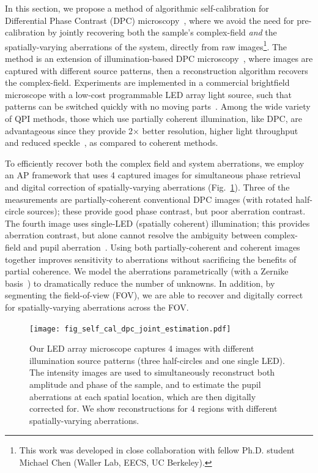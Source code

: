 In this section, we propose a method of algorithmic self-calibration for Differential Phase Contrast (DPC) microscopy~\cite{kachar1985asymmetric,mehta2009quantitative,tian2015quantitative,Claus2015,chen20163d,PhillipsChen17cDPC}, where we avoid the need for pre-calibration by jointly recovering both the sample's complex-field \textit{and} the spatially-varying aberrations of the system, directly from raw images\footnote{This work was developed in close collaboration with fellow Ph.D. student Michael Chen (Waller Lab, EECS, UC Berkeley).}. The method is an extension of illumination-based DPC microscopy~\cite{mehta2009quantitative,tian2015quantitative}, where images are captured with different source patterns, then a reconstruction algorithm recovers the complex-field. Experiments are implemented in a commercial brightfield microscope with a low-cost programmable LED array light source, such that patterns can be switched quickly with no moving parts~\cite{Zheng2013,Liu2014,tian2015quantitative,tian2015computational}. Among the wide variety of QPI methods, those which use partially coherent illumination, like DPC, are advantageous since they provide 2$\times$ better resolution, higher light throughput and reduced speckle~\cite{Wang2011,rodrigo2014rapid,jingshan2015partially,tian2015quantitative}, as compared to coherent methods.


To efficiently recover both the complex field and system aberrations, we employ an AP framework that uses 4 captured images for simultaneous phase retrieval and digital correction of spatially-varying aberrations (Fig.~\ref{fig:self_cal_dpc_joint_estimation}). Three of the measurements are partially-coherent conventional DPC images (with rotated half-circle sources); these provide good phase contrast, but poor aberration contrast. The fourth image uses single-LED (spatially coherent) illumination; this provides aberration contrast, but alone cannot resolve the ambiguity between complex-field and pupil aberration~\cite{lu2016quantitative}. Using both partially-coherent and coherent images together improves sensitivity to aberrations without sacrificing the benefits of partial coherence. We model the aberrations parametrically (with a Zernike basis~\cite{ZERNIKE1934689, zheng2013characterization}) to dramatically reduce the number of unknowns. In addition, by segmenting the field-of-view (FOV), we are able to recover and digitally correct for spatially-varying aberrations across the FOV.

\begin{figure}[ht!]
\centering\texttt{[image: fig\_self\_cal\_dpc\_joint\_estimation.pdf]}
\caption{\label{fig:self_cal_dpc_joint_estimation} Our LED array microscope captures 4 images with different illumination source patterns (three half-circles and one single LED). The intensity images are used to simultaneously reconstruct both amplitude and phase of the sample, and to estimate the pupil aberrations at each spatial location, which are then digitally corrected for. We show reconstructions for 4 regions with different spatially-varying aberrations.}
\end{figure}


